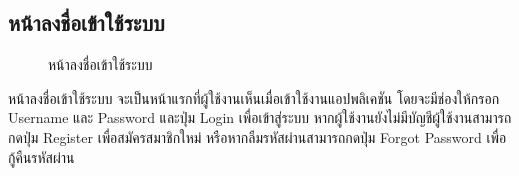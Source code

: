 \documentclass[14pt,oneside,openright,a4paper]{cpe-thai-project}
\begin{document}
\subsection{หน้าลงชื่อเข้าใช้ระบบ}
\begin{figure}[!h]\centering
  \setlength{\fboxrule}{0.5mm} %
  \setlength{\fboxsep}{0.5cm}
  \caption{หน้าลงชื่อเข้าใช้ระบบ}\label{fig:ui1}
\end{figure}
\hspace*{1cm} หน้าลงชื่อเข้าใช้ระบบ จะเป็นหน้าแรกที่ผู้ใช้งานเห็นเมื่อเข้าใช้งานแอปพลิเคชัน โดยจะมีช่องให้กรอก Username และ Password และปุ่ม Login เพื่อเข้าสู่ระบบ หากผู้ใช้งานยังไม่มีบัญชีผู้ใช้งานสามารถกดปุ่ม Register เพื่อสมัครสมาชิกใหม่ หรือหากลืมรหัสผ่านสามารถกดปุ่ม Forgot Password เพื่อกู้คืนรหัสผ่าน

\newpage
\end{document}

